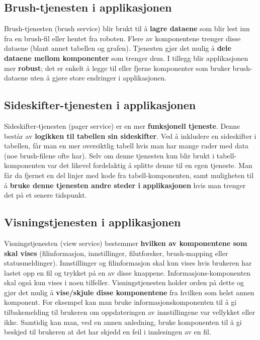 \subsection{Brush-tjenesten i applikasjonen}
Brush-tjenesten (brush service) blir brukt til å \textbf{lagre dataene} som blir lest inn fra en brush-fil eller hentet fra roboten. Flere av komponentene trenger disse dataene (blant annet tabellen og grafen). Tjenesten gjør det mulig å \textbf{dele dataene mellom komponenter} som trenger dem. I tillegg blir applikasjonen mer \textbf{robust}; det er enkelt å legge til eller fjerne komponenter som bruker brush-dataene uten å gjøre store endringer i applikasjonen.

\subsection{Sideskifter-tjenesten i applikasjonen}
Sideskifter-tjenesten (pager service) er en mer \textbf{funksjonell tjeneste}. Denne består av \textbf{logikken til tabellen sin sideskifter}. Ved å inkludere en sideskifter i tabellen, får man en mer oversiktlig tabell hvis man har mange rader med data (noe brush-filene ofte har). Selv om denne tjenesten kun blir brukt i tabell-komponenten var det likevel fordelaktig å splitte denne til en egen tjeneste. Man får da fjernet en del linjer med kode fra tabell-komponenten, samt muligheten til å \textbf{bruke denne tjenesten andre steder i applikasjonen} hvis man trenger det på et senere tidspunkt.

\subsection{Visningstjenesten i applikasjonen}
Visningstjenesten (view service) bestemmer \textbf{hvilken av komponentene som skal vises} (filinformasjon, innstillinger, filutforsker, brush-mapping eller statusmeldinger). Innstillinger og filinformasjon skal kun vises hvis brukeren har lastet opp en fil og trykket på en av disse knappene. Informasjons-komponenten skal også kun vises i noen tilfeller. Visningstjenesten holder orden på dette og gjør det mulig å \textbf{vise/skjule disse komponentene} fra hvilken som helst annen komponent. For eksempel kan man bruke informasjonskomponenten til å gi tilbakemelding til brukeren om oppdateringen av innstillingene var vellykket eller ikke. Samtidig kan man, ved en annen anledning, bruke komponenten til å gi beskjed til brukeren at det har skjedd en feil i innlesingen av en fil.

